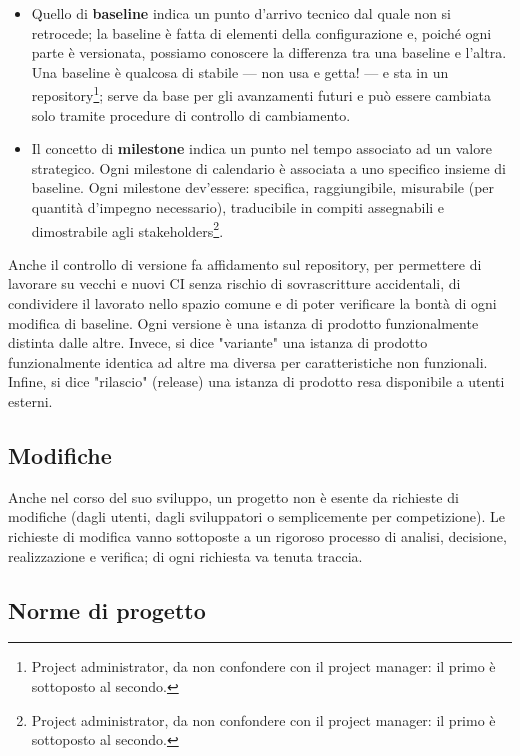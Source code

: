 \documentclass[a4paper]{article}
\begin{document}
	\begin{itemize}
		
			
	\item Quello di \textbf{baseline} indica un punto d'arrivo tecnico dal quale non si retrocede; la baseline è fatta di elementi della configurazione e, poiché ogni parte è versionata, possiamo conoscere la differenza tra una baseline e l'altra. Una baseline è qualcosa di stabile — non usa e getta! — e sta in un repository\footnote{Project administrator, da non confondere con il project manager: il primo è sottoposto al secondo.}; serve da base per gli avanzamenti futuri e può essere cambiata solo tramite procedure di controllo di cambiamento.
			
	\item Il concetto di \textbf{milestone} indica un punto nel tempo associato ad un valore strategico. Ogni milestone di calendario è associata a uno specifico insieme di baseline. Ogni milestone dev'essere: specifica, raggiungibile, misurabile (per quantità d'impegno necessario), traducibile in compiti assegnabili e dimostrabile agli stakeholders\footnote{Project administrator, da non confondere con il project manager: il primo è sottoposto al secondo.}.
		
	\end{itemize}

		
Anche il controllo di versione fa affidamento sul repository, per permettere di lavorare su vecchi e nuovi CI senza rischio di sovrascritture accidentali, di condividere il lavorato nello spazio comune e di poter verificare la bontà di ogni modifica di baseline. Ogni versione è una istanza di prodotto funzionalmente distinta dalle altre. Invece, si dice "variante" una istanza di prodotto funzionalmente identica ad altre ma diversa per caratteristiche non funzionali. Infine, si dice "rilascio" (release) una istanza di prodotto resa disponibile a utenti esterni.

		
	\subsection{Modifiche}

		
Anche nel corso del suo sviluppo, un progetto non è esente da richieste di modifiche (dagli utenti, dagli sviluppatori o semplicemente per competizione). Le richieste di modifica vanno sottoposte a un rigoroso processo di analisi, decisione, realizzazione e verifica; di ogni richiesta va tenuta traccia.

		
	\subsection{Norme di progetto}
\end{document}
